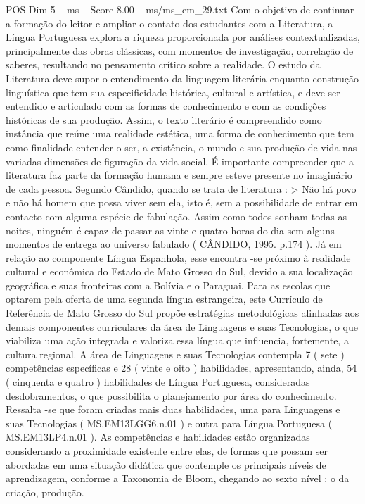 \begin{textsample}{POS Dim 5 – ms – Score 8.00 – ms/ms\_em\_29.txt}
Com o objetivo de continuar a formação do leitor e ampliar o contato dos estudantes com a Literatura, a Língua Portuguesa explora a riqueza proporcionada por análises contextualizadas, principalmente das obras clássicas, com momentos de investigação, correlação de saberes, resultando no pensamento crítico sobre a realidade.
O estudo da Literatura deve supor o entendimento da linguagem literária enquanto construção linguística que tem sua especificidade histórica, cultural e artística, e deve ser entendido e articulado com as formas de conhecimento e com as condições históricas de sua produção.
Assim, o texto literário é compreendido como instância que reúne uma realidade estética, uma forma de conhecimento que tem como finalidade entender o ser, a existência, o mundo e sua produção de vida nas variadas dimensões de figuração da vida social.
É importante compreender que a literatura faz parte da formação humana e sempre esteve presente no imaginário de cada pessoa.
Segundo Cândido, quando se trata de literatura : > Não há povo e não há homem que possa viver sem ela, isto é, sem a possibilidade de entrar em contacto com alguma espécie de fabulação.
Assim como todos sonham todas as noites, ninguém é capaz de passar as vinte e quatro horas do dia sem alguns momentos de entrega ao universo fabulado ( CÂNDIDO, 1995. p.174 ).
Já em relação ao componente Língua Espanhola, esse encontra -se próximo à realidade cultural e econômica do Estado de Mato Grosso do Sul, devido a sua localização geográfica e suas fronteiras com a Bolívia e o Paraguai.
Para as escolas que optarem pela oferta de uma segunda língua estrangeira, este Currículo de Referência de Mato Grosso do Sul propõe estratégias metodológicas alinhadas aos demais componentes curriculares da área de Linguagens e suas Tecnologias, o que viabiliza uma ação integrada e valoriza essa língua que influencia, fortemente, a cultura regional.
A área de Linguagens e suas Tecnologias contempla 7 ( sete ) competências específicas e 28 ( vinte e oito ) habilidades, apresentando, ainda, 54 ( cinquenta e quatro ) habilidades de Língua Portuguesa, consideradas desdobramentos, o que possibilita o planejamento por área do conhecimento.
Ressalta -se que foram criadas mais duas habilidades, uma para Linguagens e suas Tecnologias ( MS.EM13LGG6.n.01 ) e outra para Língua Portuguesa ( MS.EM13LP4.n.01 ).
As competências e habilidades estão organizadas considerando a proximidade existente entre elas, de formas que possam ser abordadas em uma situação didática que contemple os principais níveis de aprendizagem, conforme a Taxonomia de Bloom, chegando ao sexto nível : o da criação, produção.

\end{textsample}
